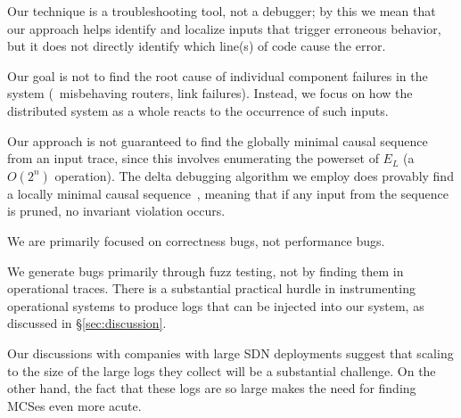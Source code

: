 
 Our technique is a troubleshooting tool, not a debugger;
by this we mean that our approach helps identify and localize inputs that
trigger erroneous behavior, but it does not directly identify which
line(s) of code cause the error.

 Our goal is not to find the root
cause of individual component failures in the system (\eg~misbehaving routers,
link failures). Instead, we focus on
how the distributed system as a whole reacts to the occurrence of such inputs.

Our approach is not guaranteed to find the globally minimal
causal sequence from an input trace, since this involves enumerating the powerset of
$E_L$ (a $O(2^n)$ operation).
The delta debugging algorithm we employ does provably find a
locally minimal causal sequence~\cite{Zeller:1999:YMP:318773.318946},
meaning that if any input from the sequence is pruned, no invariant violation
occurs.

We are primarily focused on correctness bugs, not performance bugs.

We generate bugs primarily through fuzz testing, not by finding them in
operational traces. There is a substantial practical hurdle in instrumenting
operational systems to produce logs that can be injected into our system, as
discussed in \S\ref{sec:discussion}.

Our discussions with companies with large SDN deployments suggest that scaling to the size of the
large logs they collect will be a substantial challenge.
On the other hand, the fact that these logs are so large makes the need for finding MCSes even more acute.


